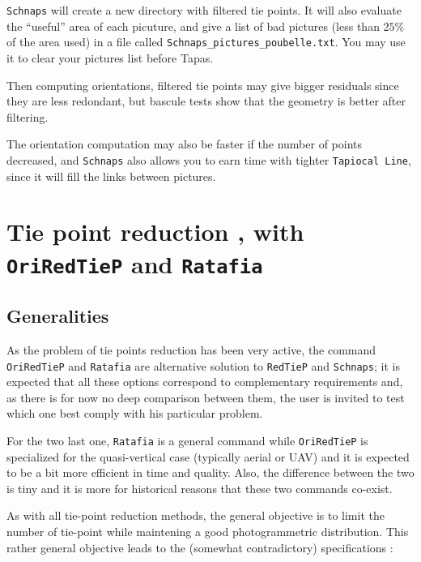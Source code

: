 {\tt Schnaps} will create a new directory with filtered tie points.
It will also evaluate the ``useful'' area of each picuture, and give a list of bad pictures (less than $25\%$ of the area used) in a file called {\tt Schnaps\_pictures\_poubelle.txt}. You may use it to clear your pictures list before Tapas.

Then computing orientations, filtered tie points may give bigger residuals since they are less redondant, but bascule tests show that the geometry is better
after filtering.

The orientation computation may also be faster if the number of points decreased, and {\tt Schnaps} also allows you to earn time with tighter {\tt Tapiocal Line},
since it will fill the links between pictures.


\section{Tie point reduction , with {\tt OriRedTieP} and {\tt Ratafia}}

\subsection{Generalities}

As the problem of tie points reduction has been very active, the command  {\tt OriRedTieP} 
and {\tt Ratafia} are alternative solution to  {\tt RedTieP} and {\tt Schnaps}; it is
expected that all these options correspond to complementary requirements and, as there is for 
now no deep comparison between them, the user is invited to test which one best comply with his particular problem.

For the two last one,  {\tt Ratafia} is a general command while {\tt OriRedTieP} is specialized for 
the quasi-vertical case (typically aerial or UAV) and it is expected to be a bit more
efficient in time and quality. Also, the difference between the two is tiny and it is more for historical reasons
that these two commands co-exist.



As with all tie-point reduction methods, the general  objective is to
limit the number of tie-point while maintening a good photogrammetric distribution. 
This rather general objective leads to the (somewhat contradictory) specifications :

